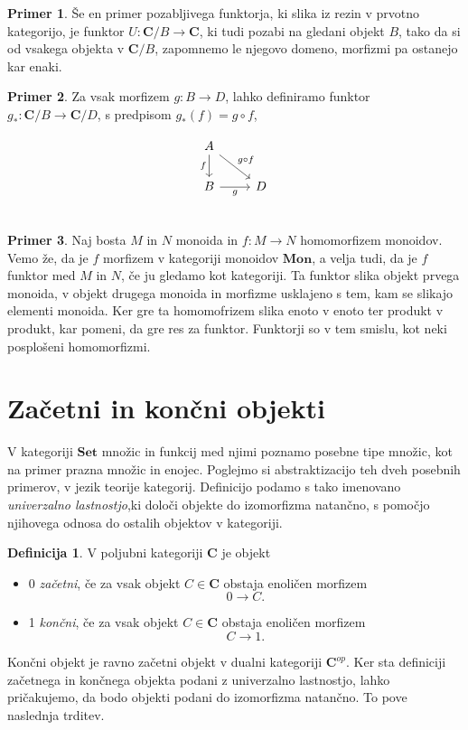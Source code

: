 \documentclass[12pt,a4paper]{book}
\theoremstyle{definition}
\newtheorem{definicija}{Definicija}[chapter]
\theoremstyle{plain}
\theoremstyle{definition}
\newtheorem{primer}{Primer}[section]
\theoremstyle{remark}
\newcommand{\cat}[1]{\textbf{#1}}
\begin{document}
\begin{primer}
Še en primer pozabljivega funktorja, ki slika iz rezin v prvotno kategorijo, je funktor $U : \cat{C}/B \to \cat{C}$, ki tudi pozabi na gledani objekt $B$, tako da si od vsakega objekta v $\cat{C}/B$, zapomnemo le njegovo domeno, morfizmi pa ostanejo kar enaki.
\end{primer}

\begin{primer}
Za vsak morfizem $g : B \to D$, lahko definiramo funktor $g_* : \cat{C}/B \to \cat{C}/D$, s predpisom $g_*(f) = g \circ f$,

$$\begin{tikzcd}
A \ar[d, "f"'] \ar[dr, "g \circ f"] & \\
B \ar[r, "g"'] & D \\
\end{tikzcd}$$

\end{primer}

\begin{primer}
Naj bosta $M$ in $N$ monoida in $f : M \to N$ homomorfizem monoidov. Vemo že, da je $f$ morfizem v kategoriji monoidov $\cat{Mon}$, a velja tudi, da je $f$ funktor med $M$ in $N$, če ju gledamo kot kategoriji. Ta funktor slika objekt prvega monoida, v objekt drugega monoida in morfizme usklajeno s tem, kam se slikajo elementi monoida. Ker gre ta homomofrizem slika enoto v enoto ter produkt v produkt, kar pomeni, da gre res za funktor. Funktorji so v tem smislu, kot neki posplošeni homomorfizmi.
\end{primer}


\section{Začetni in končni objekti}
V kategoriji $\cat{Set}$ množic in funkcij med njimi poznamo posebne tipe množic, kot na primer prazna množic in enojec. Poglejmo si abstraktizacijo teh dveh posebnih primerov, v jezik teorije kategorij. Definicijo podamo s tako imenovano \textit{univerzalno lastnostjo},ki določi objekte do izomorfizma natančno, s pomočjo njihovega odnosa do ostalih objektov v kategoriji.

\begin{definicija}
V poljubni kategoriji $\cat{C}$ je objekt
\begin{itemize}
\item 0 \emph{začetni}, če za vsak objekt $C \in \cat{C}$ obstaja enoličen morfizem $$0 \to C.$$
\item 1 \emph{končni}, če za vsak objekt $C \in \cat{C}$ obstaja enoličen morfizem $$C \to 1.$$
\end{itemize}
\end{definicija}
Končni objekt je ravno začetni objekt v dualni kategoriji $\cat{C}^{op}$. Ker sta definiciji začetnega in končnega objekta podani z univerzalno lastnostjo, lahko pričakujemo, da bodo objekti podani do izomorfizma natančno. To pove naslednja trditev.
\end{document}

